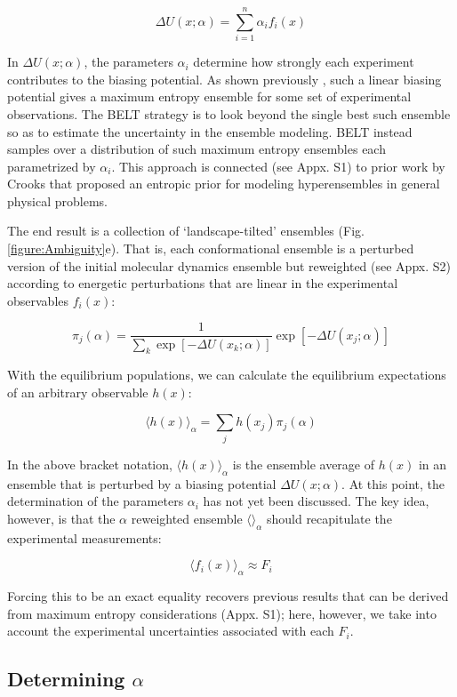 \documentclass[journal=jacsat,manuscript=article]{achemso}
\begin{document}
$$\Delta U(x;\alpha) = \sum_{i=1}^n \alpha_i f_i(x)$$

In $\Delta U(x;\alpha)$, the parameters $\alpha_i$ determine how strongly each experiment contributes to the biasing potential.  As shown previously \cite{chodera2012}, such a linear biasing potential gives a maximum entropy ensemble for some set of experimental observations. The BELT strategy is to look beyond the single best such ensemble so as to estimate the uncertainty in the ensemble modeling. BELT instead samples over a distribution of such maximum entropy ensembles each parametrized by $\alpha_i$. This approach is connected (see Appx. S1) to prior work by Crooks that proposed an entropic prior for modeling hyperensembles in general physical problems. 

The end result is a collection of `landscape-tilted' ensembles (Fig. \ref{figure:Ambiguity}e). That is, each conformational ensemble is a perturbed version of the initial molecular dynamics ensemble but reweighted (see Appx. S2) according to energetic perturbations that are linear in the experimental observables $f_i(x)$:

$$\pi_j(\alpha) = \frac{1}{\sum_k \exp[-\Delta U(x_k;\alpha)]} \exp[-\Delta U(x_j;\alpha)]$$

With the equilibrium populations, we can calculate the equilibrium expectations of an arbitrary observable $h(x)$:

$$\langle h(x)\rangle _\alpha = \sum_j h(x_j) \pi_j(\alpha)$$

In the above bracket notation, $\langle h(x)\rangle _\alpha$ is the ensemble average of $h(x)$ in an ensemble that is perturbed by a biasing potential $\Delta U(x;\alpha)$.  At this point, the determination of the parameters $\alpha_i$ has not yet been discussed.  The key idea, however, is that the $\alpha$ reweighted ensemble $\langle \rangle _\alpha$ should recapitulate the experimental measurements:

$$\langle f_i(x)\rangle _\alpha \approx F_i$$

Forcing this to be an exact equality recovers previous results \cite{chodera2012} that can be derived from maximum entropy considerations (Appx. S1); here, however, we take into account the experimental uncertainties associated with each $F_i$.  

\subsection*{Determining $\alpha$}
\end{document}
